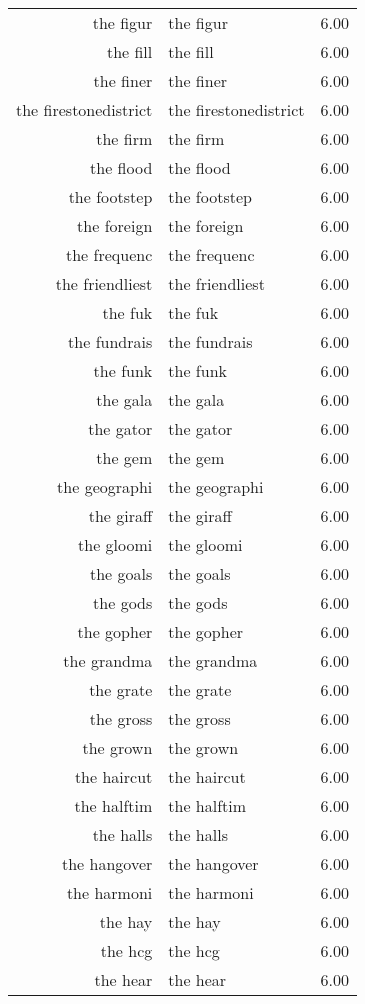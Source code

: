 \begin{table}[ht]
\begin{tabular}{rlr}
  the figur & the figur & 6.00 \\ 
  the fill & the fill & 6.00 \\ 
  the finer & the finer & 6.00 \\ 
  the firestonedistrict & the firestonedistrict & 6.00 \\ 
  the firm & the firm & 6.00 \\ 
  the flood & the flood & 6.00 \\ 
  the footstep & the footstep & 6.00 \\ 
  the foreign & the foreign & 6.00 \\ 
  the frequenc & the frequenc & 6.00 \\ 
  the friendliest & the friendliest & 6.00 \\ 
  the fuk & the fuk & 6.00 \\ 
  the fundrais & the fundrais & 6.00 \\ 
  the funk & the funk & 6.00 \\ 
  the gala & the gala & 6.00 \\ 
  the gator & the gator & 6.00 \\ 
  the gem & the gem & 6.00 \\ 
  the geographi & the geographi & 6.00 \\ 
  the giraff & the giraff & 6.00 \\ 
  the gloomi & the gloomi & 6.00 \\ 
  the goals & the goals & 6.00 \\ 
  the gods & the gods & 6.00 \\ 
  the gopher & the gopher & 6.00 \\ 
  the grandma & the grandma & 6.00 \\ 
  the grate & the grate & 6.00 \\ 
  the gross & the gross & 6.00 \\ 
  the grown & the grown & 6.00 \\ 
  the haircut & the haircut & 6.00 \\ 
  the halftim & the halftim & 6.00 \\ 
  the halls & the halls & 6.00 \\ 
  the hangover & the hangover & 6.00 \\ 
  the harmoni & the harmoni & 6.00 \\ 
  the hay & the hay & 6.00 \\ 
  the hcg & the hcg & 6.00 \\ 
  the hear & the hear & 6.00 \\ 

\end{tabular}
\end{table}
